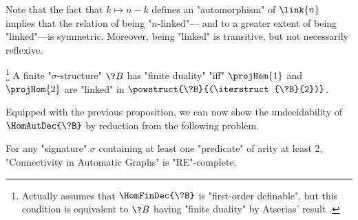 Note that the fact that $k \mapsto n-k$
defines an "automorphism" of $\link{n}$ implies that the relation of being "$n$-linked"---%
and to a greater extent of being "linked"---is symmetric.
Moreover, being "linked" is transitive, but not necessarily reflexive.


\begin{proposition}%
	\!\footnote{Actually \cite[Theorem 4.7]{LaroseLotenTardif2007CharacterisationFOCSP} assumes
	that $\HomFinDec{\?B}$ is "first-order definable", but this condition
	is equivalent to $\?B$ having "finite duality" by Atserias' result
	\cite[Corollary 4]{Atserias2008DigraphColoring}.}%
	\AP\label{prop:characterization-finite-duality-path-projections}
	A finite "$\sigma$-structure" $\?B$ has "finite duality" "iff"
	$\projHom{1}$ and $\projHom{2}$ are "linked" in $\powstruct{\?B}{(\iterstruct{\?B}{2})}$.
\end{proposition}

Equipped with the previous proposition, we can now show the undecidability 
of $\HomAutDec{\?B}$ by reduction from the following problem.

\begin{property}
	\AP\label{prop:undecidability-connectivity}
	For any "signature" $\sigma$ containing at least one "predicate" of
	arity at least 2, "Connectivity in Automatic Graphs" is "RE"-complete.
\end{property}


